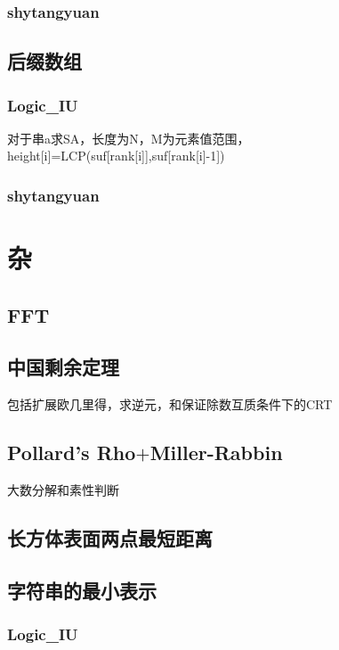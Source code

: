 \documentclass[a4paper,10pt]{book}
\begin{document}
		\subsection{shytangyuan}
			

	\section{后缀数组}
		\subsection{Logic\_IU}
			对于串a求SA，长度为N，M为元素值范围，height[i]=LCP(suf[rank[i]],suf[rank[i]-1])
			
		\subsection{shytangyuan}
			

\chapter{杂}
	\section{FFT}
		

	\section{中国剩余定理}
	    包括扩展欧几里得，求逆元，和保证除数互质条件下的CRT
	    

	\section{Pollard's Rho$+$Miller-Rabbin}
	    大数分解和素性判断
	    
    
    \section{长方体表面两点最短距离}
        

	\section{字符串的最小表示}
		\subsection{Logic\_IU}
			
\end{document}
